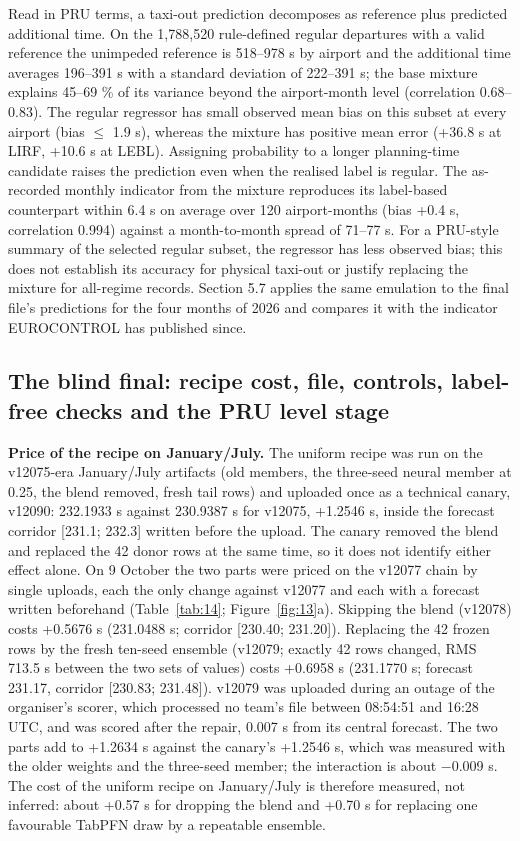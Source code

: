 \documentclass[11pt,a4paper]{article}
\begin{document}
Read in PRU terms, a taxi-out prediction decomposes as reference plus predicted additional time. On the 1,788,520 rule-defined regular departures with a valid reference the unimpeded reference is 518--978 s by airport and the additional time averages 196--391 s with a standard deviation of 222--391 s; the base mixture explains 45--69 \% of its variance beyond the airport-month level (correlation 0.68--0.83). The regular regressor has small observed mean bias on this subset at every airport (\textbar bias\textbar{} $\le$ 1.9 s), whereas the mixture has positive mean error (+36.8 s at LIRF, +10.6 s at LEBL). Assigning probability to a longer planning-time candidate raises the prediction even when the realised label is regular. The as-recorded monthly indicator from the mixture reproduces its label-based counterpart within 6.4 s on average over 120 airport-months (bias +0.4 s, correlation 0.994) against a month-to-month spread of 71--77 s. For a PRU-style summary of the selected regular subset, the regressor has less observed bias; this does not establish its accuracy for physical taxi-out or justify replacing the mixture for all-regime records. Section 5.7 applies the same emulation to the final file's predictions for the four months of 2026 and compares it with the indicator EUROCONTROL has published since.

\subsection{The blind final: recipe cost, file, controls, label-free checks and the PRU level stage}\label{the-blind-final-recipe-cost-file-controls-label-free-checks-and-the-pru-level-stage}

\textbf{Price of the recipe on January/July.} The uniform recipe was run on the v12075-era January/July artifacts (old members, the three-seed neural member at 0.25, the blend removed, fresh tail rows) and uploaded once as a technical canary, v12090: 232.1933 s against 230.9387 s for v12075, +1.2546 s, inside the forecast corridor {[}231.1; 232.3{]} written before the upload. The canary removed the blend and replaced the 42 donor rows at the same time, so it does not identify either effect alone. On 9 October the two parts were priced on the v12077 chain by single uploads, each the only change against v12077 and each with a forecast written beforehand (Table~\ref{tab:14}; Figure~\ref{fig:13}a). Skipping the blend (v12078) costs +0.5676 s (231.0488 s; corridor {[}230.40; 231.20{]}). Replacing the 42 frozen rows by the fresh ten-seed ensemble (v12079; exactly 42 rows changed, RMS 713.5 s between the two sets of values) costs +0.6958 s (231.1770 s; forecast 231.17, corridor {[}230.83; 231.48{]}). v12079 was uploaded during an outage of the organiser's scorer, which processed no team's file between 08:54:51 and 16:28 UTC, and was scored after the repair, 0.007 s from its central forecast. The two parts add to +1.2634 s against the canary's +1.2546 s, which was measured with the older weights and the three-seed member; the interaction is about $-$0.009 s. The cost of the uniform recipe on January/July is therefore measured, not inferred: about +0.57 s for dropping the blend and +0.70 s for replacing one favourable TabPFN draw by a repeatable ensemble.
\end{document}
